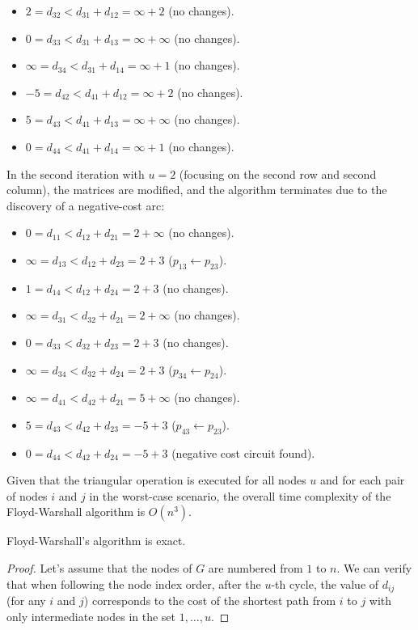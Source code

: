 \begin{example}
\begin{itemize}
        \item $2=d_{32} < d_{31} + d_{12} = \infty + 2$ (no changes). 
        \item $0=d_{33} < d_{31} + d_{13} = \infty + \infty$ (no changes). 
        \item $\infty=d_{34} < d_{31} + d_{14} = \infty + 1$ (no changes). 
        \item $-5=d_{42} < d_{41} + d_{12} = \infty + 2$ (no changes). 
        \item $5=d_{43} < d_{41} + d_{13} = \infty + \infty$ (no changes). 
        \item $0=d_{44} < d_{41} + d_{14} = \infty + 1$ (no changes). 
    \end{itemize}
    In the second iteration with $u=2$ (focusing on the second row and second column), the matrices are modified, and the algorithm terminates due to the discovery of a negative-cost arc:
    \begin{itemize}
        \item $0=d_{11} < d_{12} + d_{21} = 2 +\infty $ (no changes). 
        \item $\infty=d_{13} < d_{12} + d_{23} = 2+3$ ($p_{13} \leftarrow p_{23}$). 
        \item $1=d_{14} < d_{12} + d_{24} = 2+3$ (no changes). 
        \item $\infty=d_{31} < d_{32} + d_{21} = 2 + \infty$ (no changes). 
        \item $0=d_{33} < d_{32} + d_{23} = 2+3$ (no changes). 
        \item $\infty=d_{34} < d_{32} + d_{24} = 2+3$ ($p_{34} \leftarrow p_{24}$). 
        \item $\infty=d_{41} < d_{42} + d_{21} = 5 + \infty$ (no changes). 
        \item $5=d_{43} < d_{42} + d_{23} = -5+3$ ($p_{43} \leftarrow p_{23}$). 
        \item $0=d_{44} < d_{42} + d_{24} = -5+3$ (negative cost circuit found). 
    \end{itemize}
\end{example}
Given that the triangular operation is executed for all nodes $u$ and for each pair of nodes $i$ and $j$ in the worst-case scenario, the overall time complexity of the Floyd-Warshall algorithm is $O(n^3)$.
\begin{proposition}
    Floyd-Warshall's algorithm is exact. 
\end{proposition}
\begin{proof}
    Let's assume that the nodes of $G$ are numbered from $1$ to $n$. 
    We can verify that when following the node index order, after the $u$-th cycle, the value of $d_{ij}$ (for any $i$ and $j$) corresponds to the cost of the shortest path from $i$ to $j$ with only intermediate nodes in the set ${1,\dots,u}$. 
\end{proof}

